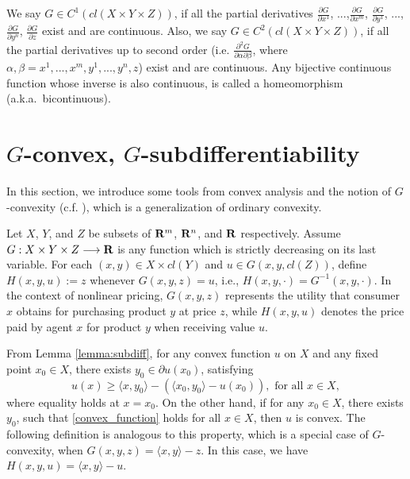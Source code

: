 We say $G \in C^{1}(cl(X\times Y \times Z))$, if all the partial derivatives $\frac{\partial G}{\partial x^1}$, ...,$\frac{\partial G}{\partial x^m}$, $\frac{\partial G}{\partial y^1}$, ..., $\frac{\partial G}{\partial y^n}$, $\frac{\partial G}{\partial z}$ exist and are continuous. Also, we say $G \in C^{2}(cl(X\times Y \times Z))$, if all the partial derivatives up to second order (i.e. $\frac{\partial^2 G}{\partial \alpha \partial \beta}$, where $\alpha, \beta = x^1, ... , x^m, y^1, ..., y^n, z$) exist and are continuous. Any bijective continuous function whose inverse is also continuous, is called a homeomorphism (a.k.a.\ bicontinuous).
\medskip



\section{$G$-convex, $G$-subdifferentiability}\label{section:G-convexity}
In this section, we introduce some tools from convex analysis and the notion of $G$-convexity  (c.f. \cite{Trudinger14,Balder77,Singer97}), which is a generalization of ordinary convexity. \medskip

Let $X$, $Y$, and $Z$ be subsets of ${\mathbf R}^m$, ${\mathbf R}^n$, and ${\mathbf R}$ respectively. Assume $G: X \times Y \times Z \longrightarrow {\mathbf R}$ is any function which is strictly decreasing on its last variable. For each $(x, y) \in X\times cl(Y)$ and $u\in G(x,y, cl(Z))$, define $H(x,y,u) := z$ whenever $G(x,y,z) = u$, i.e., $H(x, y, \cdot)= G^{-1}(x,y,\cdot)$. In the context of nonlinear pricing, $G(x,y,z)$ represents the utility that consumer $x$ obtains for purchasing product $y$ at price $z$, while $H(x,y,u)$ denotes the price paid by agent $x$ for product $y$ when receiving value $u$. \medskip


From Lemma \ref{lemma:subdiff}, for any convex function $u$ on $X$ and any fixed point $x_0 \in X$, there exists $y_0 \in \partial u(x_0)$, satisfying%
\begin{equation}\label{convex_function}
	u(x) \ge  \langle x , y_0\rangle -( \langle x_0, y_0\rangle -  u(x_0)),	\text{  for all $x \in X$},
\end{equation} 
where equality holds at $x = x_0$. On the other hand, if for any $x_0\in X$, there exists $y_0$, such that \eqref{convex_function} holds for all $x\in X$, then $u$ is convex. The following definition is analogous to this property, which is a special case of $G$-convexity, when $G(x,y,z) = \langle x, y \rangle -z$. In this case, we have $H(x,y,u) = \langle x, y \rangle -u$. \medskip
	
